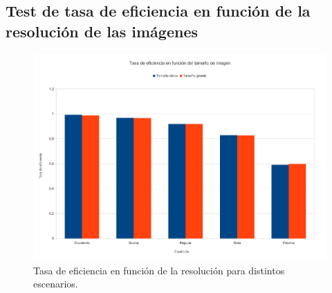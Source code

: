 \subsection{Test de tasa de eficiencia en función de la resolución de las imágenes}
\begin{figure}[H]{}
\centering
\includegraphics[scale=0.5]{graphs/TEvsRes.pdf}
\caption{Tasa de eficiencia en función de la resolución para distintos escenarios.}
\label{TEvsRes}
\end{figure}
